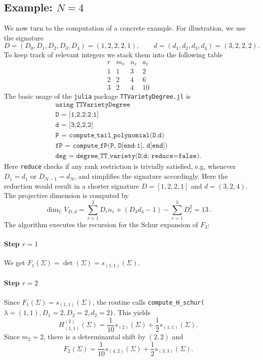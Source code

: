\documentclass{article}
\theoremstyle{definition}
\newcommand{\C}{\mathbb{C}}
\begin{document}
\subsection{Example: $N=4$} We now turn to the computation of a concrete example. For illustration, we use the signature
\[
D=(D_0,D_1,D_2,D_3,D_4)=(1,2,2,2,1),
\qquad
d=(d_1,d_2,d_3,d_4)=(3,2,2,2).
\]
To keep track of relevant integers we stack them into the following table
\[
\begin{array}{c||c|c|c}
r & m_r & n_r & a_r\\
\hline
1 & 1 & 3 & 2\\
2 & 2 & 4 & 6\\
3 & 2 & 4 & 10
\end{array} 
\]
The basic usage of the \texttt{julia} package \texttt{TTVarietyDegree.jl} is
\[
\begin{array}{l}
\texttt{using TTVarietyDegree} \\
\texttt{D = [1,2,2,2,1]} \\
\texttt{d = [3,2,2,2]} \\
\texttt{P = compute\_tail\_polynomial(D,d)} \\
\texttt{fP = compute\_fP(P, D[end-1], d[end])} \\
\texttt{deg = degree\_TT\_variety(D,d; reduce=false)}.
\end{array}
\]
Here \texttt{reduce} checks if any rank restriction is trivially satisfied, e.g, whenever $D_1 = d_1$ or $D_{N-1} = d_N$, and simplifies the signature accordingly. Here the reduction would result in a shorter signature $D=[1, 2, 2,1]$ and $d=(3, 2, 4)$.
The projective dimension is computed by
\begin{equation*}
    \dim_{\C} V_{D,d}
=
\sum_{r=1}^{3} D_rn_r + (D_3d_4 
-1) - \sum_{r=1}^{3}D_r^2 = 13 \,.
\end{equation*}
The algorithm executes the recursion for the Schur expansion of $F_3$:
\paragraph{Step $r=1$}
We get $F_1(\Sigma)
=
\det(\Sigma)
=
s_{(1,1)}(\Sigma)$.

\paragraph{Step $r=2$}
Since $F_1(\Sigma)=s_{(1,1)}(\Sigma)$, the routine calls \texttt{compute\_H\_schur($\lambda=(1,1), D_1=2, D_2=2, d_2=2$)}. This yields
\begin{equation*}
    H_{(1,1)}^{(2)}(\Sigma)
=
\frac{1}{10}s_{(2)}(\Sigma)
+
\frac{1}{2}s_{(1,1)}(\Sigma).
\end{equation*}
Since \(m_2=2\), there is a determinantal shift by \((2,2)\) and
\[
F_2(\Sigma)
=
\frac{1}{10}s_{(4,2)}(\Sigma)
+
\frac{1}{2}s_{(3,3)}(\Sigma).
\]
\end{document}
